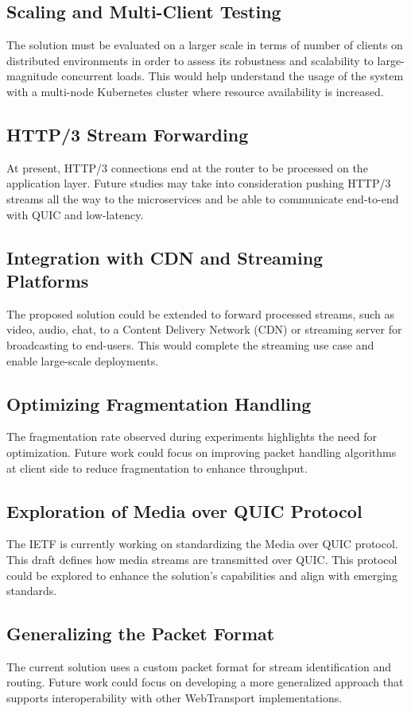 \subsection{Scaling and Multi-Client Testing}
The solution must be evaluated on a larger scale in terms of number of clients on distributed environments in order to assess its robustness and scalability to large-magnitude concurrent loads. This would help understand the usage of the system with a multi-node Kubernetes cluster where resource availability is increased.

\subsection{HTTP/3 Stream Forwarding}
At present, HTTP/3 connections end at the router to be processed on the application layer. Future studies may take into consideration pushing HTTP/3 streams all the way to the microservices and be able to communicate end-to-end with QUIC and low-latency.

\subsection{Integration with CDN and Streaming Platforms}
The proposed solution could be extended to forward processed streams, such as video, audio, chat, to a Content Delivery Network (CDN) or streaming server for broadcasting to end-users. This would complete the streaming use case and enable large-scale deployments.

\subsection{Optimizing Fragmentation Handling}
The fragmentation rate observed during experiments highlights the need for optimization. Future work could focus on improving packet handling algorithms at client side to reduce fragmentation to enhance throughput.

\subsection{Exploration of Media over QUIC Protocol}
The IETF is currently working on standardizing the Media over QUIC protocol. This draft defines how media streams are transmitted over QUIC. This protocol could be explored to enhance the solution's capabilities and align with emerging standards.

\subsection{Generalizing the Packet Format}
The current solution uses a custom packet format for stream identification and routing. Future work could focus on developing a more generalized approach that supports interoperability with other WebTransport implementations.

